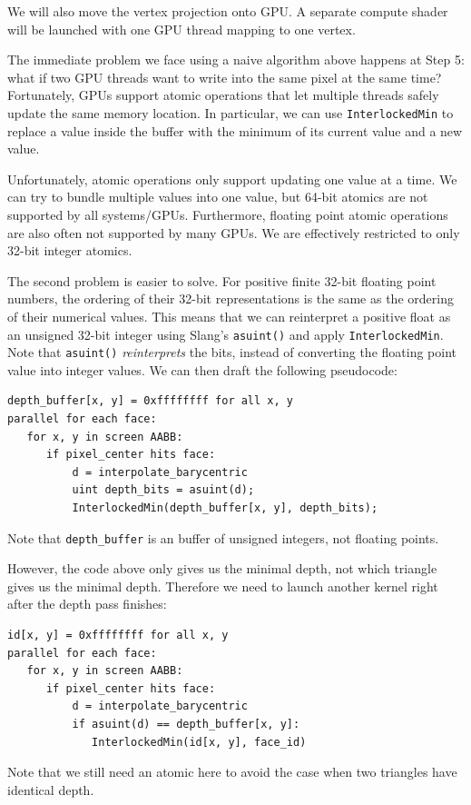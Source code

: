 We will also move the vertex projection onto GPU. A separate compute shader will be launched with one GPU thread mapping to one vertex.

The immediate problem we face using a naive algorithm above happens at Step 5: what if two GPU threads want to write into the same pixel at the same time?
Fortunately, GPUs support atomic operations that let multiple threads safely update the same memory location.
In particular, we can use \lstinline{InterlockedMin} to replace a value inside the buffer with the minimum of its current value and a new value.

Unfortunately, atomic operations only support updating one value at a time. We can try to bundle multiple values into one value, but 64-bit atomics are not
supported by all systems/GPUs. Furthermore, floating point atomic operations are also often not supported by many GPUs. We are effectively restricted
to only 32-bit integer atomics.

The second problem is easier to solve. 
For positive finite 32-bit floating point numbers, the ordering of their 32-bit representations is the same as the ordering of their numerical values.
This means that we can reinterpret a positive float as an unsigned 32-bit integer using Slang's \lstinline{asuint()} and apply \lstinline{InterlockedMin}.
Note that \lstinline{asuint()} \emph{reinterprets} the bits, instead of converting the floating point value into integer values. We can then draft the
following pseudocode:
\begin{lstlisting}
depth_buffer[x, y] = 0xffffffff for all x, y
parallel for each face:
   for x, y in screen AABB:
      if pixel_center hits face:
          d = interpolate_barycentric
          uint depth_bits = asuint(d);
          InterlockedMin(depth_buffer[x, y], depth_bits);
\end{lstlisting}
Note that \lstinline{depth_buffer} is an buffer of unsigned integers, not floating points.

However, the code above only gives us the minimal depth, not which triangle gives us the minimal depth. Therefore we need to launch another kernel right after the
depth pass finishes:
\begin{lstlisting}
id[x, y] = 0xffffffff for all x, y
parallel for each face:
   for x, y in screen AABB:
      if pixel_center hits face:
          d = interpolate_barycentric
          if asuint(d) == depth_buffer[x, y]:
             InterlockedMin(id[x, y], face_id)
\end{lstlisting}
Note that we still need an atomic here to avoid the case when two triangles have identical depth.


